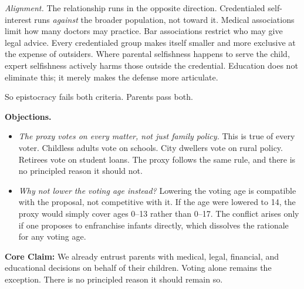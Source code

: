 \documentclass[11pt]{article}
\begin{document}
\textit{Alignment.} The relationship runs in the opposite direction. Credentialed self-interest runs \textit{against} the broader population, not toward it. Medical associations limit how many doctors may practice. Bar associations restrict who may give legal advice. Every credentialed group makes itself smaller and more exclusive at the expense of outsiders. Where parental selfishness happens to serve the child, expert selfishness actively harms those outside the credential. Education does not eliminate this; it merely makes the defense more articulate.

So epistocracy fails both criteria. Parents pass both.

\textbf{Objections.}

\begin{itemize}[nosep, leftmargin=1.5em, itemsep=2pt]
    \item \textit{The proxy votes on every matter, not just family policy.} This is true of every voter. Childless adults vote on schools. City dwellers vote on rural policy. Retirees vote on student loans. The proxy follows the same rule, and there is no principled reason it should not.
    \item \textit{Why not lower the voting age instead?} Lowering the voting age is compatible with the proposal, not competitive with it. If the age were lowered to 14, the proxy would simply cover ages 0--13 rather than 0--17. The conflict arises only if one proposes to enfranchise infants directly, which dissolves the rationale for any voting age.
\end{itemize}

\textbf{Core Claim:} We already entrust parents with medical, legal, financial, and educational decisions on behalf of their children. Voting alone remains the exception. There is no principled reason it should remain so.
\end{document}
